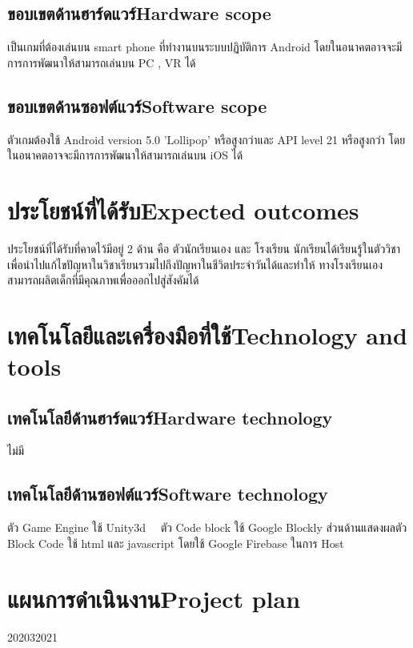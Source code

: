 \subsection{\ifcpe ขอบเขตด้านฮาร์ดแวร์\else Hardware scope\fi}
เป็นเกมที่ต้องเล่นบน smart phone ที่ทำงานบนระบบปฏิบัติการ Android โดยในอนาคตอาจจะมีการการพัฒนาให้สามารถเล่นบน PC , VR ได้
\subsection{\ifcpe ขอบเขตด้านซอฟต์แวร์\else Software scope\fi}
ตัวเกมต้องใช้ Android version 5.0 'Lollipop' หรือสูงกว่าและ API level 21 หรือสูงกว่า
โดยในอนาคตอาจจะมีการการพัฒนาให้สามารถเล่นบน iOS ได้
\section{\ifcpe ประโยชน์ที่ได้รับ\else Expected outcomes\fi}
ประโยชน์ที่ได้รับที่คาดไว้มีอยู่ 2 ด้าน คือ ตัวนักเรียนเอง และ โรงเรียน นักเรียนได้เรียนรู้ในตัววิชาเพื่อนำไปแก้ไขปัญหาในวิชาเรียนรวมไปถึงปัญหาในชีวิตประจำวันได้และทำให้
ทางโรงเรียนเองสามารถผลิตเด็กที่มีคุณภาพเพื่อออกไปสู่สังคัมได้
\section{\ifcpe เทคโนโลยีและเครื่องมือที่ใช้\else Technology and tools\fi}

\subsection{\ifcpe เทคโนโลยีด้านฮาร์ดแวร์\else Hardware technology\fi}
ไม่มี
\subsection{\ifcpe เทคโนโลยีด้านซอฟต์แวร์\else Software technology\fi}
ตัว Game Engine ใช้ Unity3d~\cite{utb}~\cite{ud} ตัว Code block ใช้ Google Blockly\cite{gb}
ส่วนด้านแสดงผลตัว Block Code ใช้ html และ javascript โดยใช้ Google Firebase\cite{fb} ในการ Host
\section{\ifcpe แผนการดำเนินงาน\else Project plan\fi}

\begin{plan}{7}{2020}{3}{2021}
\end{plan}

